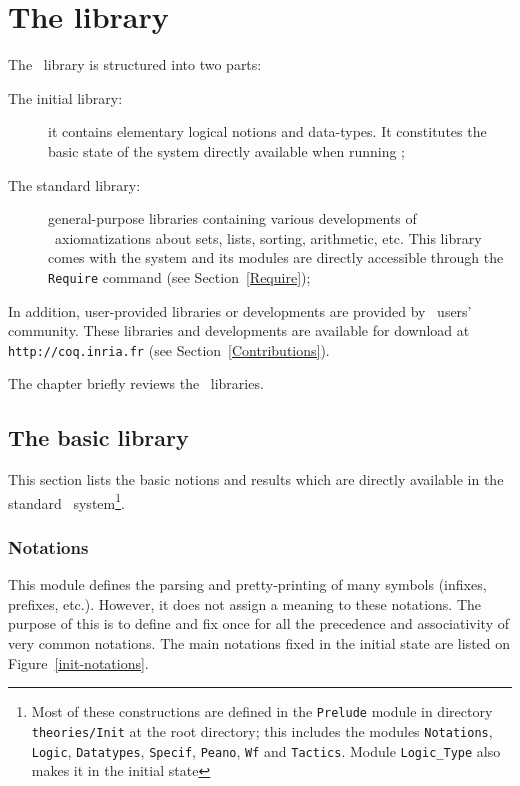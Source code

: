 \chapter[The {\Coq} library]{The {\Coq} library\label{Theories}}

The \Coq\ library is structured into two parts:

\begin{description}
\item[The initial library:] it contains
  elementary logical notions and data-types. It constitutes the
  basic state of the system directly available when running
  \Coq;

\item[The standard library:] general-purpose libraries containing
  various developments of \Coq\ axiomatizations about sets, lists,
  sorting, arithmetic, etc. This library comes with the system and its
  modules are directly accessible through the \verb!Require! command
  (see Section~\ref{Require});
\end{description}

In addition, user-provided libraries or developments are provided by
\Coq\ users' community. These libraries and developments are available
for download at \texttt{http://coq.inria.fr} (see
Section~\ref{Contributions}).

The chapter briefly reviews the \Coq\ libraries.

\section[The basic library]{The basic library\label{Prelude}}

This section lists the basic notions and results which are directly
available in the standard \Coq\ system\footnote{Most 
of these constructions are defined in the
{\tt Prelude} module in directory {\tt theories/Init} at the {\Coq}
root directory; this includes the modules
{\tt Notations},
{\tt Logic},
{\tt Datatypes},
{\tt Specif},
{\tt Peano},
{\tt Wf} and 
{\tt Tactics}.
Module {\tt Logic\_Type} also makes it in the initial state}.

\subsection[Notations]{Notations\label{Notations}}

This module defines the parsing and pretty-printing of many symbols
(infixes, prefixes, etc.). However, it does not assign a meaning to
these notations. The purpose of this is to define and fix once for all
the precedence and associativity of very common notations. The main
notations fixed in the initial state are listed on
Figure~\ref{init-notations}.

